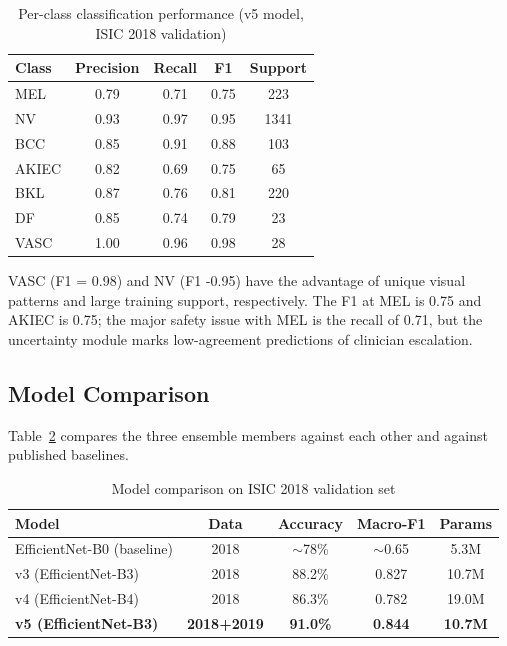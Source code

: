 \documentclass[conference]{IEEEtran}
\begin{document}
\begin{table}[htbp]
\centering
\caption{Per-class classification performance (v5 model, ISIC 2018 validation)}
\label{tab:perclass}
\begin{tabular}{lcccc}
\toprule
Class & Precision & Recall & F1 & Support \\
\midrule
MEL  & 0.79 & 0.71 & 0.75 & 223 \\
NV   & 0.93 & 0.97 & 0.95 & 1341 \\
BCC  & 0.85 & 0.91 & 0.88 & 103 \\
AKIEC& 0.82 & 0.69 & 0.75 & 65 \\
BKL  & 0.87 & 0.76 & 0.81 & 220 \\
DF   & 0.85 & 0.74 & 0.79 & 23 \\
VASC & 1.00 & 0.96 & 0.98 & 28 \\
\bottomrule
\end{tabular}
\end{table}

VASC (F1 = 0.98) and NV (F1 -0.95) have the advantage of unique visual patterns and large training support, respectively. The F1 at MEL is 0.75 and AKIEC is 0.75; the major safety issue with MEL is the recall of 0.71, but the uncertainty module marks low-agreement predictions of clinician escalation.

\subsection{Model Comparison}

Table~\ref{tab:model_comparison} compares the three ensemble members against each other and against published baselines.

\begin{table}[htbp]
\centering
\caption{Model comparison on ISIC 2018 validation set}
\label{tab:model_comparison}
\begin{tabular}{lcccc}
\toprule
Model & Data & Accuracy & Macro-F1 & Params \\
\midrule
EfficientNet-B0 (baseline) & 2018 & $\sim$78\% & $\sim$0.65 & 5.3M \\
v3 (EfficientNet-B3) & 2018 & 88.2\% & 0.827 & 10.7M \\
v4 (EfficientNet-B4) & 2018 & 86.3\% & 0.782 & 19.0M \\
\textbf{v5 (EfficientNet-B3)} & \textbf{2018+2019} & \textbf{91.0\%} & \textbf{0.844} & \textbf{10.7M} \\
\bottomrule
\end{tabular}
\end{table}
\end{document}
